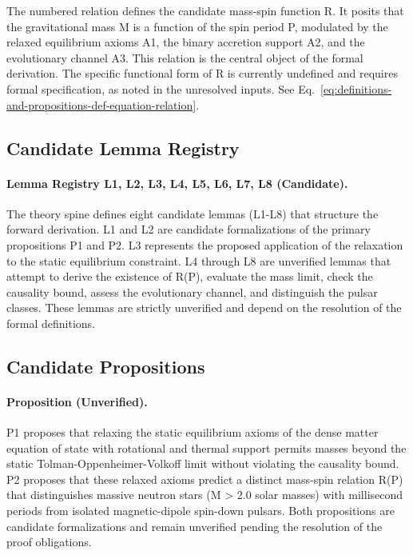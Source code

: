 \documentclass[conference]{IEEEtran}
\begin{document}
The numbered relation defines the candidate mass-spin function R. It posits that the gravitational mass M is a function of the spin period P, modulated by the relaxed equilibrium axioms A1, the binary accretion support A2, and the evolutionary channel A3. This relation is the central object of the formal derivation. The specific functional form of R is currently undefined and requires formal specification, as noted in the unresolved inputs. See Eq.~\eqref{eq:definitions-and-propositions-def-equation-relation}.

\subsection{Candidate Lemma Registry}
\paragraph{Lemma Registry L1, L2, L3, L4, L5, L6, L7, L8 (Candidate).} The theory spine defines eight candidate lemmas (L1-L8) that structure the forward derivation. L1 and L2 are candidate formalizations of the primary propositions P1 and P2. L3 represents the proposed application of the relaxation to the static equilibrium constraint. L4 through L8 are unverified lemmas that attempt to derive the existence of R(P), evaluate the mass limit, check the causality bound, assess the evolutionary channel, and distinguish the pulsar classes. These lemmas are strictly unverified and depend on the resolution of the formal definitions.

\subsection{Candidate Propositions}
\paragraph{Proposition (Unverified).} P1 proposes that relaxing the static equilibrium axioms of the dense matter equation of state with rotational and thermal support permits masses beyond the static Tolman-Oppenheimer-Volkoff limit without violating the causality bound. P2 proposes that these relaxed axioms predict a distinct mass-spin relation R(P) that distinguishes massive neutron stars (M > 2.0 solar masses) with millisecond periods from isolated magnetic-dipole spin-down pulsars. Both propositions are candidate formalizations and remain unverified pending the resolution of the proof obligations.
\end{document}
